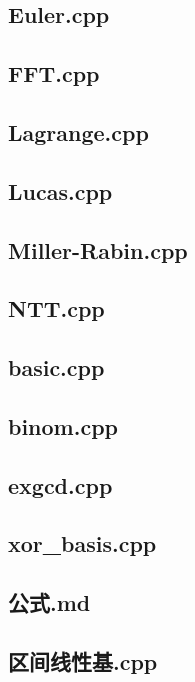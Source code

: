 \subsection{Euler.cpp}

\subsection{FFT.cpp}

\subsection{Lagrange.cpp}

\subsection{Lucas.cpp}

\subsection{Miller-Rabin.cpp}

\subsection{NTT.cpp}

\subsection{basic.cpp}

\subsection{binom.cpp}

\subsection{exgcd.cpp}

\subsection{xor\_basis.cpp}

\subsection{公式.md}

\subsection{区间线性基.cpp}

